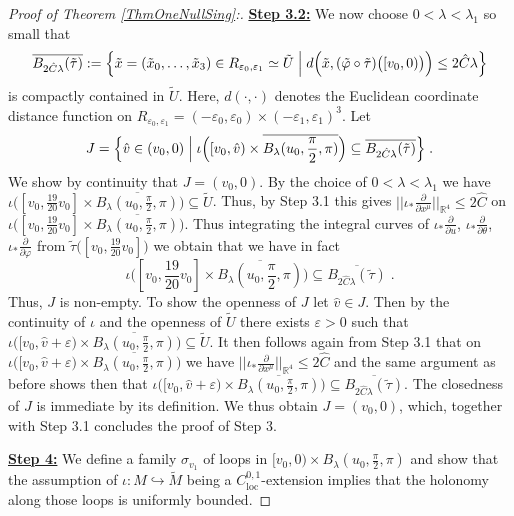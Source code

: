 \documentclass[reqno]{article}
\newcommand{\R}{\mathbb{R}}
\newcommand{\loc}{\mathrm{loc}}
\newcommand{\Reps}{R_{\varepsilon_0, \varepsilon_1}}
\newcommand{\rd}{\partial}
\begin{document}
\begin{proof}[Proof of Theorem \ref{ThmOneNullSing}:]
\underline{\textbf{Step 3.2:}} We now choose $0 < \lambda < \lambda_1$ so small that $$\overline{B_{2 \hat{C} \lambda}(\tilde{\tau})} := \Big{\{} \tilde{x} = (\tilde{x}_0, \ldots, \tilde{x}_3) \in \Reps \simeq \tilde{U} \; \Big| \; d\Big( \tilde{x}, (\tilde{\varphi} \circ \tilde{\tau})\big([v_0, 0)\big)\Big) \leq 2\hat{C} \lambda \Big{\}} $$
is compactly contained in $\tilde{U}$. Here, $d(\cdot, \cdot)$ denotes the Euclidean coordinate distance function  on $\Reps = (-\varepsilon_0, \varepsilon_0) \times (-\varepsilon_1, \varepsilon_1)^3$. Let $$J =\Big{\{} \hat{v} \in (v_0, 0) \; \Big| \; \iota\Big( [v_0, \hat{v}) \times \overline{B_{\lambda}(u_0, \frac{\pi}{2}, \pi)}\Big) \subseteq \overline{B_{2 \hat{C} \lambda}(\tilde{\tau})} \Big{\}} \;. $$
We show by continuity that $J = (v_0, 0)$. By the choice of $0 < \lambda < \lambda_1$ we have $\iota\Big( [v_0, \frac{19}{20} v_0] \times \overline{B_{\lambda}(u_0, \frac{\pi}{2}, \pi)}\Big) \subseteq \tilde{U}$. Thus, by Step 3.1 this gives $|| \iota_* \frac{\rd}{\rd x^\mu} ||_{\R^4} \leq 2 \hat{C}$ on $\iota\Big( [v_0, \frac{19}{20} v_0] \times \overline{B_{\lambda}(u_0, \frac{\pi}{2}, \pi)}\Big) $. Thus integrating the integral curves of $\iota_* \frac{\partial}{\rd u}$, $\iota_* \frac{\rd}{\rd \theta}$, $\iota_* \frac{\rd}{\rd \varphi}$ from $\tilde{\tau}\big( [v_0, \frac{19}{20} v_0]\big)$ we obtain that we have in fact $$\iota\Big( [v_0, \frac{19}{20} v_0] \times \overline{B_{\lambda}(u_0, \frac{\pi}{2}, \pi)}\Big)  \subseteq \overline{B_{2 \hat{C} \lambda}(\tilde{\tau})} \;.$$
Thus, $J$ is non-empty. To show the openness of $J$ let $\hat{v} \in J$. Then by the continuity of $\iota$ and the openness of $\tilde{U}$ there exists $\varepsilon >0$ such that  $\iota\Big( [v_0, \hat{v} + \varepsilon) \times \overline{B_{\lambda}(u_0, \frac{\pi}{2}, \pi)}\Big) \subseteq \tilde{U}$. It then follows again from Step 3.1 that on $\iota\Big( [v_0, \hat{v} + \varepsilon) \times \overline{B_{\lambda}(u_0, \frac{\pi}{2}, \pi)}\Big) $ we have $|| \iota_* \frac{\rd}{\rd x^\mu} ||_{\R^4} \leq 2 \hat{C}$ and the same argument as before shows then that $\iota\Big( [v_0, \hat{v} + \varepsilon) \times \overline{B_{\lambda}(u_0, \frac{\pi}{2}, \pi)}\Big) \subseteq \overline{B_{2 \hat{C} \lambda}(\tilde{\tau})}$. The closedness of $J$ is immediate by its definition. We thus obtain $J = (v_0, 0)$, which, together with Step 3.1 concludes the proof of Step 3.
\newline

\underline{\textbf{Step 4:}} We define a family $\sigma_{v_1}$ of loops in $[v_0, 0) \times B_\lambda (u_0, \frac{\pi}{2}, \pi)$ and show that the assumption of $\iota : M \hookrightarrow \tilde{M}$ being a $C^{0,1}_{\loc}$-extension implies that the holonomy along those loops is uniformly bounded.
\newline


\end{proof}
\end{document}

